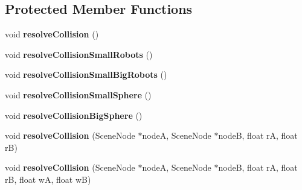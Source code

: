 \subsection*{Protected Member Functions}
\begin{DoxyCompactItemize}
\item 
\mbox{\label{class_basic_tutorial__00_a0593b0fa18b690e666b042b83070606b}} 
void {\bfseries resolve\+Collision} ()
\item 
\mbox{\label{class_basic_tutorial__00_aab1bc1d4f0ade984775b3ed651f50d6f}} 
void {\bfseries resolve\+Collision\+Small\+Robots} ()
\item 
\mbox{\label{class_basic_tutorial__00_afcf0ce12665cb66ae331dbc1eb86623d}} 
void {\bfseries resolve\+Collision\+Small\+Big\+Robots} ()
\item 
\mbox{\label{class_basic_tutorial__00_aba9704bd07c50cddf66ed6bd636fe8e2}} 
void {\bfseries resolve\+Collision\+Small\+Sphere} ()
\item 
\mbox{\label{class_basic_tutorial__00_a719fdfadd2a46df860a34b0063a3212b}} 
void {\bfseries resolve\+Collision\+Big\+Sphere} ()
\item 
\mbox{\label{class_basic_tutorial__00_a3f092adc75caa10710637e11aacb96bd}} 
void {\bfseries resolve\+Collision} (Scene\+Node $\ast$nodeA, Scene\+Node $\ast$nodeB, float rA, float rB)
\item 
\mbox{\label{class_basic_tutorial__00_a7b4f8a8aac63c3bd9b6b332077694671}} 
void {\bfseries resolve\+Collision} (Scene\+Node $\ast$nodeA, Scene\+Node $\ast$nodeB, float rA, float rB, float wA, float wB)
\end{DoxyCompactItemize}
